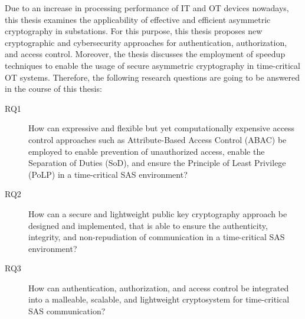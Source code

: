 Due to an increase in processing performance of IT and OT devices nowadays, this thesis examines the applicability of effective and efficient asymmetric cryptography in substations.
For this purpose, this thesis proposes new cryptographic and cybersecurity approaches for authentication, authorization, and access control.
Moreover, the thesis discusses the employment of speedup techniques to enable the usage of secure asymmetric cryptography in time-critical OT systems.
Therefore, the following research questions are going to be answered in the course of this thesis:
\begin{description}
    \item[RQ1] How can expressive and flexible but yet computationally expensive access control approaches such as Attribute-Based Access Control (ABAC) be employed to enable prevention of unauthorized access, enable the Separation of Duties (SoD), and ensure the Principle of Least Privilege (PoLP) in a time-critical SAS environment?
    \item[RQ2] How can a secure and lightweight public key cryptography approach be designed and implemented, that is able to ensure the authenticity, integrity, and non-repudiation of communication in a time-critical SAS environment?
    \item[RQ3] How can authentication, authorization, and access control be integrated into a malleable, scalable, and lightweight cryptosystem for time-critical SAS communication?
\end{description}

